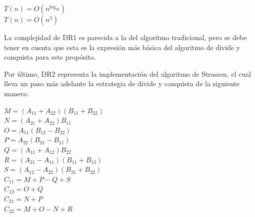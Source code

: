 \documentclass[12pt]{report}
\begin{document}
  \begin{center}
    $ T(n) = O(n^{\log_28}) $ \\
    $ T(n) = O(n^3) $
  \end{center}

  La complejidad de DR1 es parecida a la del algoritmo tradicional, pero se debe tener en cuenta que esta es la expresión más básica del algoritmo de divide y conquista para este propósito.

  \begin{center}
  \end{center}

  Por último, DR2 representa la implementación del algoritmo de Strassen, el cual lleva un paso más adelante la estrategia de divide y conquista de la siguiente manera:

  \begin{center}
    $ M = (A_{11} + A_{22})(B_{11} + B_{22}) $ \\
    $ N = (A_{21} + A_{22})B_{11} $ \\
    $ O = A_{11}(B_{12} - B_{22}) $ \\
    $ P = A_{22}(B_{21} - B_{11}) $ \\
    $ Q = (A_{11} + A_{12})B_{22} $ \\
    $ R = (A_{21} - A_{11})(B_{11} + B_{12}) $\\
    $ S = (A_{12} - A_{22})(B_{21} + B_{22}) $ \\
    $ C_{11} = M + P - Q + S $ \\
    $ C_{12} = O + Q $ \\
    $ C_{21} = N + P $ \\
    $ C_{22} = M + O - N + R $
  \end{center}
\end{document}
